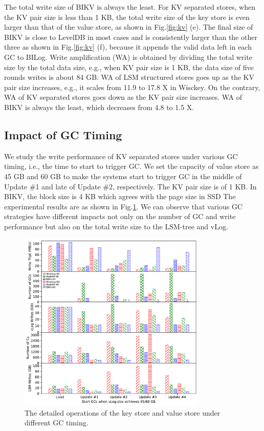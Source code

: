 \documentclass[sigconf]{acmart}
\begin{document}
The total write size of BIKV is always the least. For KV separated stores, when the KV pair size is less than 1 KB, the total write size of the key store is even larger than that of the value store, as shown in Fig.\ref{fig:kv} (e). The final size of BIKV is close to LevelDB in most cases and is consistently larger than the other three as shown in Fig.\ref{fig:kv} (f), because it appends the valid data left in each GC to BILog. Write amplification (WA) is obtained by dividing the total write size by the total data size, e.g., when KV pair size is 1 KB, the data size of five rounds writes is about 84 GB. WA of LSM structured stores goes up as the KV pair size increases, e.g., it scales from 11.9 to 17.8 X in Wisckey. On the contrary, WA of KV separated stores goes down as the KV pair size increases. WA of BIKV is always the least, which decreases from 4.8 to 1.5 X.


\subsection{Impact of GC Timing}
We study the write performance of KV separated stores under various GC timing, i.e., the time to start to trigger GC. We set the capacity of value store as 45 GB and 60 GB to make the systems start to trigger GC in the middle of Update \#1 and late of Update \#2, respectively. The KV pair size is of 1 KB. In BIKV, the block size is 4 KB which agrees with the page size in SSD {\color{red}{(SSD page size is not 4KB !! )}} The experimental results are as shown in Fig.\ref{fig:gc}. We can observe that various GC strategies have different impacts not only on the number of GC and write performance but also on the total write size to the LSM-tree and vLog.

\begin{figure}[!t]
	\setlength{\abovecaptionskip}{0.cm}	
	\setlength{\belowcaptionskip}{-0.cm}
	\centering
	\includegraphics[width=90mm]{gc_timing.pdf}
	\caption{The detailed operations of the key store and value store under different GC timing.}
	\label{fig:gc}
\end{figure}
\end{document}
